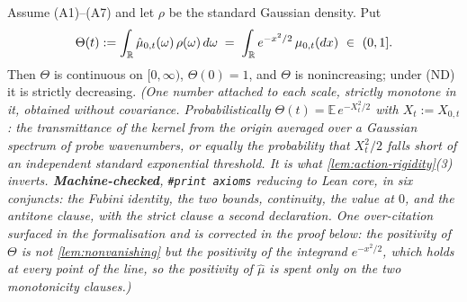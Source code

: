 \begin{corollary}\label{cor:smoothed-transmittance}
\leanok
Assume (A1)--(A7) and let $\rho$ be the standard Gaussian density. Put
\[
  \Theta(t) := \int_{\mathbb{R}} \hat\mu_{0,t}(\omega)\,\rho(\omega)\,d\omega
   \;=\; \int_{\mathbb{R}} e^{-x^2/2}\,\mu_{0,t}(dx) \ \in\ (0,1].
\]
Then $\Theta$ is continuous on $[0,\infty)$, $\Theta(0) = 1$, and $\Theta$ is nonincreasing;
under (ND) it is strictly decreasing.
\statusT\quad\emph{(One number attached to each scale, strictly monotone in it, obtained
without covariance. Probabilistically $\Theta(t) = \mathbb{E}\,e^{-X_t^2/2}$ with
$X_t := X_{0,t}$: the transmittance of the kernel from the origin averaged over a Gaussian
spectrum of probe wavenumbers, or equally the probability that $X_t^2/2$ falls short of an
independent standard exponential threshold. It is what \ref{lem:action-rigidity}(3) inverts.
\textbf{Machine-checked}, \texttt{\#print axioms} reducing to Lean core, in six conjuncts: the
Fubini identity, the two bounds, continuity, the value at $0$, and the antitone clause, with
the strict clause a second declaration. One over-citation surfaced in the formalisation and is
corrected in the proof below: the positivity of $\Theta$ is not \ref{lem:nonvanishing} but the
positivity of the integrand $e^{-x^2/2}$, which holds at every point of the line, so the
positivity of $\hat\mu$ is spent only on the two monotonicity clauses.)}
\end{corollary}

